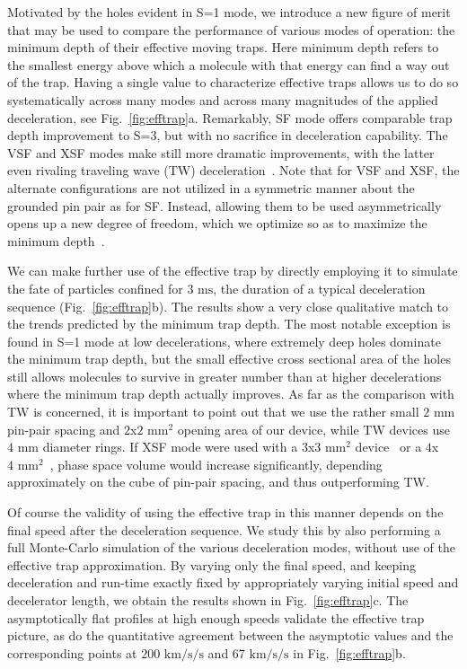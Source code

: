 \documentclass[%
 reprint,
 amsmath,amssymb,
 aps,
prl,
]{revtex4-1}
\newcommand{\ST}{{S=3}}
\begin{document}
Motivated by the holes evident in S=1 mode, we introduce a new figure of merit that may be used to compare the performance of various modes of operation: the minimum depth of their effective moving traps.
Here minimum depth refers to the smallest energy above which a molecule with that energy can find a way out of the trap.
Having a single value to characterize effective traps allows us to do so systematically across many modes and across many magnitudes of the applied deceleration, see Fig.~\ref{fig:efftrap}a. Remarkably, SF mode offers comparable trap depth improvement to \ST, but with no sacrifice in deceleration capability. 
The VSF and XSF modes make still more dramatic improvements, with the latter even rivaling traveling wave (TW) deceleration~\cite{Osterwalder2010}. 
Note that for VSF and XSF, the alternate configurations are not utilized in a symmetric manner about the grounded pin pair as for SF. 
Instead, allowing them to be used asymmetrically opens up a new degree of freedom, which we optimize so as to maximize the minimum depth~\cite{ssm}.

We can make further use of the effective trap by directly employing it to simulate the fate of particles confined for $3\text{ ms}$, the duration of a typical deceleration sequence (Fig.~\ref{fig:efftrap}b). 
The results show a very close qualitative match to the trends predicted by the minimum trap depth. 
The most notable exception is found in S=1 mode at low decelerations, where extremely deep holes dominate the minimum trap depth, but the small effective cross sectional area of the holes still allows molecules to survive in greater number than at higher decelerations where the minimum trap depth actually improves.
As far as the comparison with TW is concerned, it is important to point out that we use the rather small $2\text{ mm}$ pin-pair spacing and $2$x$2\text{ mm}^2$ opening area of our device, while TW devices use $4\text{ mm}$ diameter rings.
If XSF mode were used with a $3$x$3\text{ mm}^2$ device~\cite{Scharfenberg2009} or a $4$x$4\text{ mm}^2$~\cite{VandeMeerakker2005}, phase space volume would increase significantly, depending approximately on the cube of pin-pair spacing, and thus outperforming TW. 

Of course the validity of using the effective trap in this manner depends on the final speed after the deceleration sequence.
We study this by also performing a full Monte-Carlo simulation of the various deceleration modes, without use of the effective trap approximation.
By varying only the final speed, and keeping deceleration and run-time exactly fixed by appropriately varying initial speed and decelerator length, we obtain the results shown in Fig.~\ref{fig:efftrap}c. 
The asymptotically flat profiles at high enough speeds validate the effective trap picture, as do the quantitative agreement between the asymptotic values and the corresponding points at $200\text{ km/s/s}$ and $67\text{ km/s/s}$ in Fig.~\ref{fig:efftrap}b. 
\end{document}
